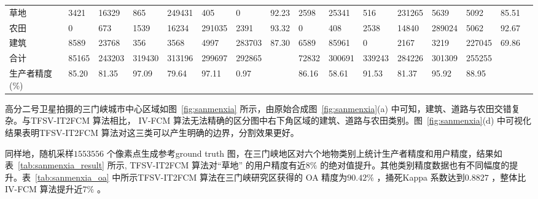 \begin{table}[htbp]
\begin{adjustbox}{max width=1.05\textwidth}
\begin{tabular} {llllllllllllllll}
            草地                                          & 3421                                     & 16329                                             & 865                        & 249431                                            & 405    & 0      & 92.23 & 2598  & 25341  & 516    & 231265 & 5639   & 5092   & 85.51 \\
            农田                                          & 0                                        & 673                                               & 1539                       & 16234                                             & 291035 & 2391   & 93.32 & 0     & 408    & 2538   & 14840  & 289024 & 5062   & 92.67 \\
            建筑                                          & 8589                                     & 23768                                             & 356                        & 3568                                              & 4997   & 283703 & 87.30 & 6589  & 85961  & 0      & 2167   & 3219   & 227045 & 69.86 \\
            合计                                          & 85165                                    & 243203                                            & 319430                     & 313196                                            & 299697 & 292865 &       & 72832 & 300691 & 339243 & 284226 & 301309 & 255255 &       \\
            生产者精度(\%)                                & 85.20                                    & 81.35                                             & 97.09                      & 79.64                                             & 97.11  & 0.97   &       & 86.16 & 58.61  & 91.53  & 81.37  & 95.92  & 88.95  &       \\
            \bottomrule
        \end{tabular}
    \end{adjustbox}
\end{table}

高分二号卫星拍摄的三门峡城市中心区域如图~\ref{fig:sanmenxia} 所示，由原始合成图~\ref{fig:sanmenxia}(a) 中可知，建筑、道路与农田交错复杂。与TFSV-IT2FCM 算法相比， IV-FCM 算法无法精确的区分图中右下角区域的建筑、道路与农田类别。图~\ref{fig:sanmenxia}(d) 中可视化结果表明TFSV-IT2FCM 算法对这三类可以产生明确的边界，分割效果更好。

同样地，随机采样$1553556$ 个像素点生成参考ground truth 图，在三门峡地区对六个地物类别上统计生产者精度和用户精度，结果如表~\ref{tab:sanmenxia_result} 所示, TFSV-IT2FCM 算法对“草地” 的用户精度有近$8\%$ 的绝对值提升。其他类别精度数据也有不同幅度的提升。表~\ref{tab:sanmenxia_oa} 中所示TFSV-IT2FCM 算法在三门峡研究区获得的 OA 精度为$90.42\%$ ，捅死Kappa 系数达到$0.8827$ ，整体比IV-FCM 算法提升近$7\%$ 。

